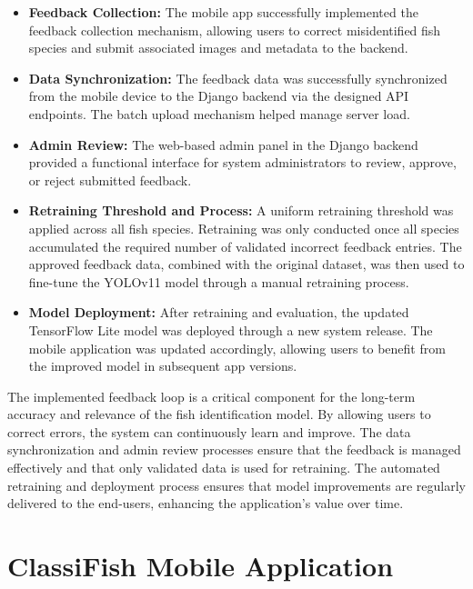 \begin{itemize}
    \item\textbf{Feedback Collection:} The mobile app successfully implemented the feedback collection mechanism, allowing users to correct misidentified fish species and submit associated images and metadata to the backend.
    
    \item\textbf{Data Synchronization:} The feedback data was successfully synchronized from the mobile device to the Django backend via the designed API endpoints. The batch upload mechanism helped manage server load.
    
    \item\textbf{Admin Review:} The web-based admin panel in the Django backend provided a functional interface for system administrators to review, approve, or reject submitted feedback.

    \item \textbf{Retraining Threshold and Process:} A uniform retraining threshold was applied across all fish species. Retraining was only conducted once all species accumulated the required number of validated incorrect feedback entries. The approved feedback data, combined with the original dataset, was then used to fine-tune the YOLOv11 model through a manual retraining process.

    \item \textbf{Model Deployment:} After retraining and evaluation, the updated TensorFlow Lite model was deployed through a new system release. The mobile application was updated accordingly, allowing users to benefit from the improved model in subsequent app versions.

\end{itemize}

The implemented feedback loop is a critical component for the long-term accuracy and relevance of the fish identification model. By allowing users to correct errors, the system can continuously learn and improve. The data synchronization and admin review processes ensure that the feedback is managed effectively and that only validated data is used for retraining. The automated retraining and deployment process ensures that model improvements are regularly delivered to the end-users, enhancing the application's value over time.

\pagebreak

\section{ClassiFish Mobile Application}

